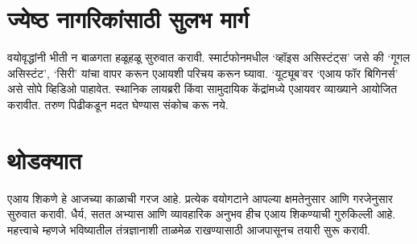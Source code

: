 \section*{ज्येष्ठ नागरिकांसाठी सुलभ मार्ग}
वयोवृद्धांनी भीती न बाळगता हळूहळू सुरुवात करावी. स्मार्टफोनमधील `व्हॉइस असिस्टंट्स' जसे की `गूगल असिस्टंट', `सिरी' यांचा वापर करून एआयशी परिचय करून घ्यावा. `यूट्यूब'वर `एआय फॉर बिगिनर्स' असे सोपे व्हिडिओ पाहावेत. स्थानिक लायब्ररी किंवा सामुदायिक केंद्रांमध्ये एआयवर व्याख्याने आयोजित करावीत. तरुण पिढीकडून मदत घेण्यास संकोच करू नये.

\section*{थोडक्यात}
एआय शिकणे हे आजच्या काळाची गरज आहे. प्रत्येक वयोगटाने आपल्या क्षमतेनुसार आणि गरजेनुसार सुरुवात करावी. धैर्य, सतत अभ्यास आणि व्यावहारिक अनुभव हीच एआय शिकण्याची गुरुकिल्ली आहे. महत्त्वाचे म्हणजे भविष्यातील तंत्रज्ञानाशी ताळमेळ राखण्यासाठी आजपासूनच तयारी सुरू करावी.